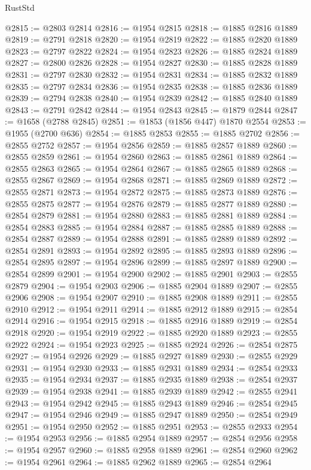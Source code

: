 \begin{lexlean}{RustStd}
\begin{coremodule}
@2815 := @2803 @2814
@2816 := @1954 @2815
@2818 := @1885 @2816 @1889
@2819 := @2791 @2818
@2820 := @1954 @2819
@2822 := @1885 @2820 @1889
@2823 := @2797 @2822
@2824 := @1954 @2823
@2826 := @1885 @2824 @1889
@2827 := @2800 @2826
@2828 := @1954 @2827
@2830 := @1885 @2828 @1889
@2831 := @2797 @2830
@2832 := @1954 @2831
@2834 := @1885 @2832 @1889
@2835 := @2797 @2834
@2836 := @1954 @2835
@2838 := @1885 @2836 @1889
@2839 := @2794 @2838
@2840 := @1954 @2839
@2842 := @1885 @2840 @1889
@2843 := @2791 @2842
@2844 := @1954 @2843
@2845 := @1879 @2844
@2847 := @1658 (@2788 @2845)
@2851 := @1853 (@1856 @447) @1870 @2554
@2853 := @1955 (@2700 @636)
@2854 := @1885 @2853
@2855 := @1885 @2702
@2856 := @2855 @2752
@2857 := @1954 @2856
@2859 := @1885 @2857 @1889
@2860 := @2855 @2859
@2861 := @1954 @2860
@2863 := @1885 @2861 @1889
@2864 := @2855 @2863
@2865 := @1954 @2864
@2867 := @1885 @2865 @1889
@2868 := @2855 @2867
@2869 := @1954 @2868
@2871 := @1885 @2869 @1889
@2872 := @2855 @2871
@2873 := @1954 @2872
@2875 := @1885 @2873 @1889
@2876 := @2855 @2875
@2877 := @1954 @2876
@2879 := @1885 @2877 @1889
@2880 := @2854 @2879
@2881 := @1954 @2880
@2883 := @1885 @2881 @1889
@2884 := @2854 @2883
@2885 := @1954 @2884
@2887 := @1885 @2885 @1889
@2888 := @2854 @2887
@2889 := @1954 @2888
@2891 := @1885 @2889 @1889
@2892 := @2854 @2891
@2893 := @1954 @2892
@2895 := @1885 @2893 @1889
@2896 := @2854 @2895
@2897 := @1954 @2896
@2899 := @1885 @2897 @1889
@2900 := @2854 @2899
@2901 := @1954 @2900
@2902 := @1885 @2901
@2903 := @2855 @2879
@2904 := @1954 @2903
@2906 := @1885 @2904 @1889
@2907 := @2855 @2906
@2908 := @1954 @2907
@2910 := @1885 @2908 @1889
@2911 := @2855 @2910
@2912 := @1954 @2911
@2914 := @1885 @2912 @1889
@2915 := @2854 @2914
@2916 := @1954 @2915
@2918 := @1885 @2916 @1889
@2919 := @2854 @2918
@2920 := @1954 @2919
@2922 := @1885 @2920 @1889
@2923 := @2855 @2922
@2924 := @1954 @2923
@2925 := @1885 @2924
@2926 := @2854 @2875
@2927 := @1954 @2926
@2929 := @1885 @2927 @1889
@2930 := @2855 @2929
@2931 := @1954 @2930
@2933 := @1885 @2931 @1889
@2934 := @2854 @2933
@2935 := @1954 @2934
@2937 := @1885 @2935 @1889
@2938 := @2854 @2937
@2939 := @1954 @2938
@2941 := @1885 @2939 @1889
@2942 := @2855 @2941
@2943 := @1954 @2942
@2945 := @1885 @2943 @1889
@2946 := @2854 @2945
@2947 := @1954 @2946
@2949 := @1885 @2947 @1889
@2950 := @2854 @2949
@2951 := @1954 @2950
@2952 := @1885 @2951
@2953 := @2855 @2933
@2954 := @1954 @2953
@2956 := @1885 @2954 @1889
@2957 := @2854 @2956
@2958 := @1954 @2957
@2960 := @1885 @2958 @1889
@2961 := @2854 @2960
@2962 := @1954 @2961
@2964 := @1885 @2962 @1889
@2965 := @2854 @2964

\end{coremodule}
\end{lexlean}
